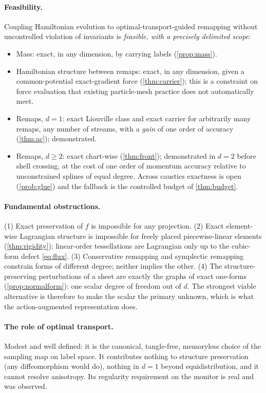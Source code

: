 \paragraph{Feasibility.} Coupling Hamiltonian evolution to optimal-transport-guided remapping without
uncontrolled violation of invariants is \emph{feasible, with a precisely delimited scope}:
\begin{itemize}[leftmargin=1.6em,itemsep=2pt]
\item Mass: exact, in any dimension, by carrying labels (\cref{prop:mass}).
\item Hamiltonian structure between remaps: exact, in any dimension, given a common-potential exact-gradient
force (\cref{thm:carrier}); this is a constraint on force evaluation that existing particle-mesh practice does not
automatically meet.
\item Remaps, $d=1$: exact Liouville class and exact carrier for arbitrarily many remaps, any number of streams,
with a \emph{gain} of one order of accuracy (\cref{thm:ac}); demonstrated.
\item Remaps, $d\ge2$: exact chart-wise (\cref{thm:front}); demonstrated in $d=2$ before shell crossing, at the cost
of one order of momentum accuracy relative to unconstrained splines of equal degree. Across caustics exactness is
open (\cref{prob:glue}) and the fallback is the controlled budget of \cref{thm:budget}.
\end{itemize}

\paragraph{Fundamental obstructions.} (1) Exact preservation of $f$ is impossible for any projection. (2) Exact
element-wise Lagrangian structure is impossible for freely placed piecewise-linear elements
(\cref{thm:rigidity}); linear-order tessellations are Lagrangian only up to the cubic-form defect \eqref{eq:flux}.
(3) Conservative remapping and symplectic remapping constrain forms of different degree; neither implies the
other. (4) The structure-preserving perturbations of a sheet are exactly the graphs of exact one-forms
(\cref{prop:normalform}): one scalar degree of freedom out of $d$. The strongest viable alternative is therefore to
make the scalar the primary unknown, which is what the action-augmented representation does.

\paragraph{The role of optimal transport.} Modest and well defined: it is the canonical, tangle-free,
memoryless choice of the sampling map on label space. It contributes nothing to structure preservation (any
diffeomorphism would do), nothing in $d=1$ beyond equidistribution, and it cannot resolve anisotropy. Its
regularity requirement on the monitor is real and was observed.

